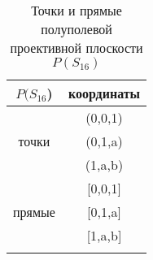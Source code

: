 
\begin{wraptable}{r}{4.0cm}
\caption{Точки и прямые полуполевой проективной плоскости $P(S_{16})$}
\label{tab:Stepanuk-1-tab-2}
\begin{tabular}{cc}
\toprule
$P(S_{16}$)                             & координаты  \\
\midrule
\multicolumn{1}{c}{\multirow{3}{*}{точки}} & (0,0,1)     \\
\multicolumn{1}{c}{}                       & (0,1,a)     \\
\multicolumn{1}{c}{}                       & (1,a,b)     \\
\multirow{3}{*}{прямые}                    & {[}0,0,1{]} \\
                                           & {[}0,1,a{]} \\
                                           & {[}1,a,b{]} \\\bottomrule\\
\end{tabular}
\end{wraptable}
